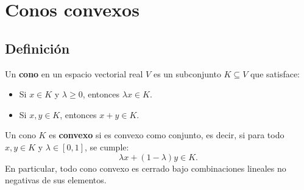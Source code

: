 \documentclass[12pt]{book}
\theoremstyle{definition}
\theoremstyle{plain}
\theoremstyle{remark}
\begin{document}


\section{Conos convexos}

\subsection{Definición}

Un \textbf{cono} en un espacio vectorial real \( V \) es un subconjunto \( K \subseteq V \) que satisface:
\begin{itemize}
    \item Si \( x \in K \) y \( \lambda \geq 0 \), entonces \( \lambda x \in K \).
    \item Si \( x, y \in K \), entonces \( x + y \in K \).
\end{itemize}

Un cono \( K \) es \textbf{convexo} si es convexo como conjunto, es decir, si para todo \( x, y \in K \) y \( \lambda \in [0,1] \), se cumple:
\[
\lambda x + (1 - \lambda) y \in K.
\]
En particular, todo cono convexo es cerrado bajo combinaciones lineales no negativas de sus elementos.
\end{document}
